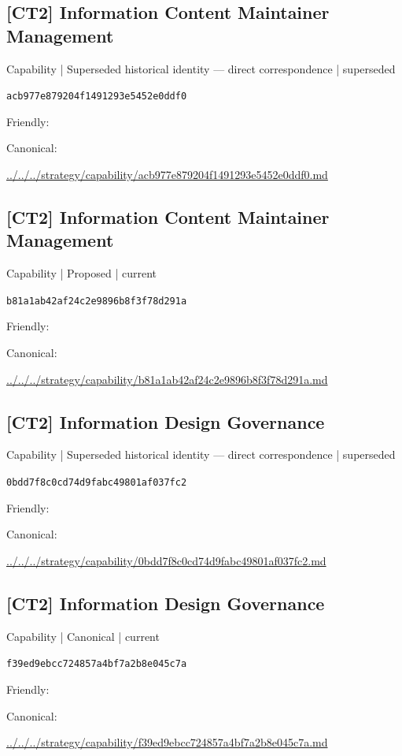 \documentclass[10pt,a4paper]{article}
\begin{document}
\subsection*{[CT2] Information Content Maintainer Management}
{\small Capability | Superseded historical identity — direct correspondence | superseded}\par
\texttt{acb977e879204f1491293e5452e0ddf0}\par
Friendly: \par
Canonical: \par
{\footnotesize\url{../../../strategy/capability/acb977e879204f1491293e5452e0ddf0.md}}\par
\subsection*{[CT2] Information Content Maintainer Management}
{\small Capability | Proposed | current}\par
\texttt{b81a1ab42af24c2e9896b8f3f78d291a}\par
Friendly: \par
Canonical: \par
{\footnotesize\url{../../../strategy/capability/b81a1ab42af24c2e9896b8f3f78d291a.md}}\par
\subsection*{[CT2] Information Design Governance}
{\small Capability | Superseded historical identity — direct correspondence | superseded}\par
\texttt{0bdd7f8c0cd74d9fabc49801af037fc2}\par
Friendly: \par
Canonical: \par
{\footnotesize\url{../../../strategy/capability/0bdd7f8c0cd74d9fabc49801af037fc2.md}}\par
\subsection*{[CT2] Information Design Governance}
{\small Capability | Canonical | current}\par
\texttt{f39ed9ebcc724857a4bf7a2b8e045c7a}\par
Friendly: \par
Canonical: \par
{\footnotesize\url{../../../strategy/capability/f39ed9ebcc724857a4bf7a2b8e045c7a.md}}\par
\end{document}
